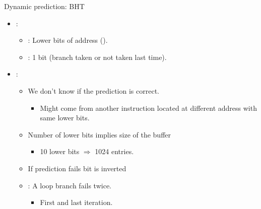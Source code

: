\begin{frame}[t]{Dynamic prediction: BHT}
\begin{itemize}
  \item {}:
    \begin{itemize}
      \item {}: Lower bits of address ().
      \item {}: 1 bit (branch taken or not taken last time).
    \end{itemize}
  \item {}:
    \begin{itemize}
      \item We don't know if the prediction is correct.
        \begin{itemize}
          \item Might come from another instruction located at different
                address with same lower bits.
        \end{itemize}
        \item Number of lower bits implies size of the buffer
          \begin{itemize}
            \item 10 lower bits $\Rightarrow$ 1024 entries.
          \end{itemize}
        \item If prediction fails bit is inverted
        \item {}: A loop branch fails twice.
          \begin{itemize}
            \item First and last iteration.
          \end{itemize}
    \end{itemize}
\end{itemize}
\end{frame}

